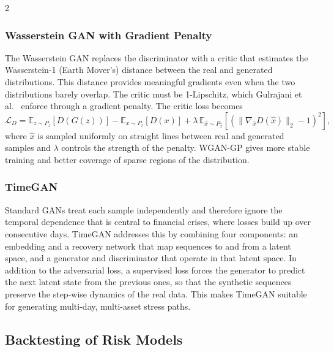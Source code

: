 \documentclass[12pt]{spieman}  %
\begin{document}
\begin{spacing}{2}
\subsubsection{Wasserstein GAN with Gradient Penalty}

The Wasserstein GAN \cite{Arjovsky17} replaces the discriminator with a critic that estimates the Wasserstein-1 (Earth Mover's) distance between the real and generated distributions. This distance provides meaningful gradients even when the two distributions barely overlap. The critic must be 1-Lipschitz, which Gulrajani et al.\ \cite{Gulrajani17} enforce through a gradient penalty. The critic loss becomes
\begin{equation}
\mathcal{L}_D = \mathbb{E}_{z\sim P_z}[D(G(z))] - \mathbb{E}_{x\sim P_r}[D(x)] + \lambda\, \mathbb{E}_{\hat{x}\sim P_{\hat{x}}}\left[\left(\lVert \nabla_{\hat{x}} D(\hat{x}) \rVert_2 - 1\right)^2\right],
\end{equation}
where $\hat{x}$ is sampled uniformly on straight lines between real and generated samples and $\lambda$ controls the strength of the penalty. WGAN-GP gives more stable training and better coverage of sparse regions of the distribution.

\subsubsection{TimeGAN}

Standard GANs treat each sample independently and therefore ignore the temporal dependence that is central to financial crises, where losses build up over consecutive days. TimeGAN \cite{Yoon19} addresses this by combining four components: an embedding and a recovery network that map sequences to and from a latent space, and a generator and discriminator that operate in that latent space. In addition to the adversarial loss, a supervised loss forces the generator to predict the next latent state from the previous ones, so that the synthetic sequences preserve the step-wise dynamics of the real data. This makes TimeGAN suitable for generating multi-day, multi-asset stress paths.

\subsection{Backtesting of Risk Models}


\end{spacing}
\end{document}
